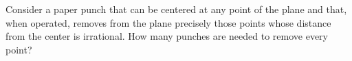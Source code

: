 Consider a paper punch that can be centered at any point of
the plane and that, when operated, removes from the plane precisely those
points whose distance from the center is irrational. How many punches are
needed to remove every point?
